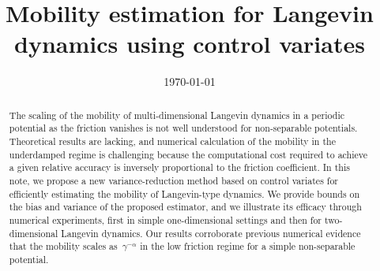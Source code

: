 \documentclass[11pt,a4paper]{article}
\date{\today}
\title{Mobility estimation for Langevin dynamics using control variates}
\author{%
}
\theoremstyle{plain}
\numberwithin{equation}{section}
\begin{document}
\maketitle

\begin{abstract}
    The scaling of the mobility of multi-dimensional Langevin dynamics in a periodic potential as the friction vanishes is not well understood for non-separable potentials.
    Theoretical results are lacking,
    and numerical calculation of the mobility in the underdamped regime is challenging because
    the computational cost required to achieve a given relative accuracy is inversely proportional to the friction coefficient.
    In this note, we propose a new variance-reduction method based on control variates for efficiently estimating the mobility of Langevin-type dynamics.
    We provide bounds on the bias and variance of the proposed estimator,
    and we illustrate its efficacy through numerical experiments,
    first in simple one-dimensional settings
    and then for two-dimensional Langevin dynamics.
    Our results corroborate previous numerical evidence that
    the mobility scales as~$\gamma^{-\alpha}$ in the low friction regime for a simple non-separable potential.
\end{abstract}
\end{document}
